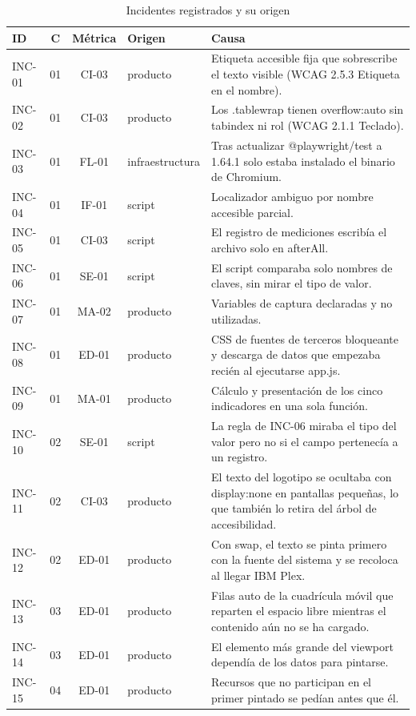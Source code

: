 \documentclass[conference,a4paper]{IEEEtran}
\begin{document}
\begin{table}[t]
\caption{Incidentes registrados y su origen}
\label{tab:inc}
\centering\scriptsize
\setlength{\tabcolsep}{4pt}
\begin{tabular}{@{}lccL{1.9cm}L{12.4cm}@{}}
\toprule
ID & C & Métrica & Origen & Causa \\
\midrule
INC-01 & 01 & CI-03 & producto & Etiqueta accesible fija que sobrescribe el texto visible (WCAG 2.5.3 Etiqueta en el nombre). \\
INC-02 & 01 & CI-03 & producto & Los .tablewrap tienen overflow:auto sin tabindex ni rol (WCAG 2.1.1 Teclado). \\
INC-03 & 01 & FL-01 & infraestructura & Tras actualizar @playwright/test a 1.64.1 solo estaba instalado el binario de Chromium. \\
INC-04 & 01 & IF-01 & script & Localizador ambiguo por nombre accesible parcial. \\
INC-05 & 01 & CI-03 & script & El registro de mediciones escribía el archivo solo en afterAll. \\
INC-06 & 01 & SE-01 & script & El script comparaba solo nombres de claves, sin mirar el tipo de valor. \\
INC-07 & 01 & MA-02 & producto & Variables de captura declaradas y no utilizadas. \\
INC-08 & 01 & ED-01 & producto & CSS de fuentes de terceros bloqueante y descarga de datos que empezaba recién al ejecutarse app.js. \\
INC-09 & 01 & MA-01 & producto & Cálculo y presentación de los cinco indicadores en una sola función. \\
INC-10 & 02 & SE-01 & script & La regla de INC-06 miraba el tipo del valor pero no si el campo pertenecía a un registro. \\
INC-11 & 02 & CI-03 & producto & El texto del logotipo se ocultaba con display:none en pantallas pequeñas, lo que también lo retira del árbol de accesibilidad. \\
INC-12 & 02 & ED-01 & producto & Con swap, el texto se pinta primero con la fuente del sistema y se recoloca al llegar IBM Plex. \\
INC-13 & 03 & ED-01 & producto & Filas auto de la cuadrícula móvil que reparten el espacio libre mientras el contenido aún no se ha cargado. \\
INC-14 & 03 & ED-01 & producto & El elemento más grande del viewport dependía de los datos para pintarse. \\
INC-15 & 04 & ED-01 & producto & Recursos que no participan en el primer pintado se pedían antes que él. \\

\end{tabular}
\end{table}
\end{document}
